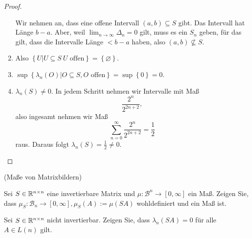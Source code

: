 \begin{proof}
\begin{parts}
\begin{enumerate}[label=(\roman*)]
	Wir nehmen an, dass eine offene Intervall $(a,b)\subseteq S$ gibt. Das Intervall hat Länge $b-a$. Aber, weil $\lim_{n \to \infty} \Delta_n=0$ gilt, muss es ein $S_n$ geben, f\"{u}r das gilt, dass die Intervalle Länge $<b-a$ haben, also $(a,b)\not\subseteq S$. 
\item Also $\left\{U| U\subseteq S~U\text{ offen} \right\} =\left\{ \varnothing \right\} $.
\item $\sup\left\{ \lambda_n(O)|O\subseteq S, O\text{ offen} \right\} =\sup\left\{ 0 \right\} =0$.
\item $\lambda_n(S) \neq 0$. In jedem Schritt nehmen wir Intervalle mit Maß
	\[
		\frac{2^{n}}{2^{2n+2}}
	,\] 
	also ingesamt nehmen wir Maß
	\[
		\sum_{n=0}^{\infty} \frac{2^n}{2^{2n+2}}=\frac{1}{2}
	\]
	raus. Daraus folgt $\lambda_n(S)=\frac{1}{2}\neq 0$.\qedhere
\end{enumerate}
	\end{parts}
\end{proof}
\begin{Problem}
	(Maße von Matrixbildern) 
	\begin{parts}
	\item Sei $S \in \mathbb{R}^{n\times n}$ eine invertierbare Matrix und $\mu : \mathcal{B}^n \to [0, \infty]$ ein Maß. Zeigen Sie, dass $\mu_S : \mathcal{B}_n\to [0,\infty],\mu_S(A):=\mu(SA)$ wohldefiniert und ein Maß ist.
	\item Sei $S \in \mathbb{R}^{n\times n}$ nicht invertierbar. Zeigen Sie, dass $\lambda_n(SA)=0$ für alle $A \in L(n)$ gilt.
	\end{parts}
\end{Problem}
